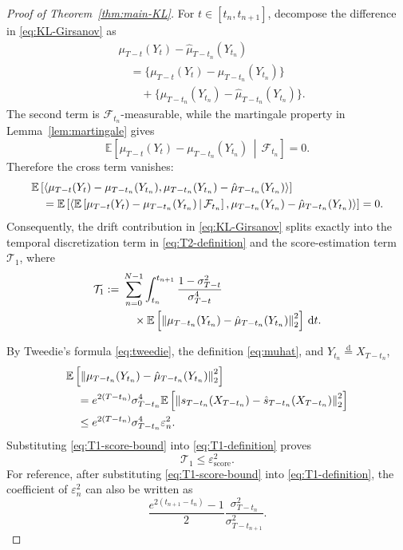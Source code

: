 \documentclass[11pt]{article}
\theoremstyle{definition}
\newcommand{\E}{\mathbb{E}}
\newcommand{\norm}[1]{\left\lVert #1\right\rVert_2}
\newcommand{\ip}[2]{\left\langle #1,#2\right\rangle}
\newcommand{\scoreerr}{\varepsilon_{\mathrm{score}}}
\newcommand{\dd}{\,\mathrm{d}}
\begin{document}
\begin{proof}[Proof of Theorem~\ref{thm:main-KL}]
For $t\in[t_n,t_{n+1}]$, decompose the difference in
\eqref{eq:KL-Girsanov} as
\begin{align*}
&\mu_{T-t}(Y_t)-\hat\mu_{T-t_n}(Y_{t_n})\\
&\quad=
\{\mu_{T-t}(Y_t)-\mu_{T-t_n}(Y_{t_n})\}\\
&\qquad+
\{\mu_{T-t_n}(Y_{t_n})
  -\hat\mu_{T-t_n}(Y_{t_n})\}.
\end{align*}
The second term is $\mathcal F_{t_n}$-measurable, while the martingale
property in Lemma~\ref{lem:martingale} gives
\[
    \E\left[
       \mu_{T-t}(Y_t)-\mu_{T-t_n}(Y_{t_n})
       \,\middle|\,
       \mathcal F_{t_n}
    \right]=0.
\]
Therefore the cross term vanishes:
\begin{align}
&\E\left[
  \ip{
     \mu_{T-t}(Y_t)-\mu_{T-t_n}(Y_{t_n})
  }{
     \mu_{T-t_n}(Y_{t_n})
     -\hat\mu_{T-t_n}(Y_{t_n})
  }
\right]
\notag\\
&\quad=
\E\left[
  \ip{
     \E\left[
        \mu_{T-t}(Y_t)-\mu_{T-t_n}(Y_{t_n})
        \,\middle|\,
        \mathcal F_{t_n}
     \right]
  }{
     \mu_{T-t_n}(Y_{t_n})
     -\hat\mu_{T-t_n}(Y_{t_n})
  }
\right]
=0.
\label{eq:KL-cross-zero}
\end{align}
Consequently, the drift contribution in \eqref{eq:KL-Girsanov}
splits exactly into the temporal discretization term in
\eqref{eq:T2-definition} and the score-estimation term
$\mathcal T_1$, where
\begin{align}
    \mathcal T_1
    :={}&
    \sum_{n=0}^{N-1}
    \int_{t_n}^{t_{n+1}}
    \frac{1-\sigma_{T-t}^2}{\sigma_{T-t}^4}\notag\\
    &\quad\times
    \E\left[
       \norm{
          \mu_{T-t_n}(Y_{t_n})
          -\hat\mu_{T-t_n}(Y_{t_n})
       }^2
    \right]\dd t.
\label{eq:T1-definition}
\end{align}

By Tweedie's formula \eqref{eq:tweedie}, the definition
\eqref{eq:muhat}, and
$Y_{t_n}\overset{\mathrm d}=X_{T-t_n}$,
\begin{align}
&\E\left[
   \norm{
      \mu_{T-t_n}(Y_{t_n})
      -\hat\mu_{T-t_n}(Y_{t_n})
   }^2
\right]
\notag\\
&\quad=
e^{2(T-t_n)}\sigma_{T-t_n}^4
\E\left[
   \norm{
      s_{T-t_n}(X_{T-t_n})
      -\hat s_{T-t_n}(X_{T-t_n})
   }^2
\right]
\notag\\
&\quad\le
e^{2(T-t_n)}\sigma_{T-t_n}^4\varepsilon_n^2.
\label{eq:T1-score-bound}
\end{align}
Substituting \eqref{eq:T1-score-bound} into
\eqref{eq:T1-definition} proves
\begin{equation}
    \mathcal T_1\le\scoreerr^2.
    \label{eq:T1-by-score-budget}
\end{equation}
For reference, after substituting \eqref{eq:T1-score-bound} into
\eqref{eq:T1-definition}, the coefficient of $\varepsilon_n^2$ can
also be written as
\begin{equation}
    \frac{e^{2(t_{n+1}-t_n)}-1}{2}
    \frac{\sigma_{T-t_n}^2}{\sigma_{T-t_{n+1}}^2}.
    \label{eq:KL-score-weight-explicit}
\end{equation}


\end{proof}
\end{document}
